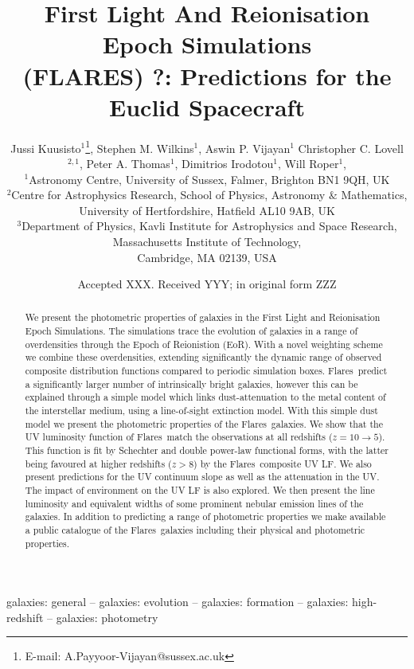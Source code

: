 \documentclass[fleqn,usenatbib]{mnras}
\title[FLARES ?]{First Light And Reionisation Epoch Simulations \\(FLARES) ?: Predictions for the Euclid Spacecraft}
\author[Kuusisto et al.]{Jussi Kuusisto$^{1}$\thanks{E-mail: A.Payyoor-Vijayan@sussex.ac.uk},
Stephen M. Wilkins$^{1}$,
Aswin P. Vijayan$^{1}$
Christopher C. Lovell$^{2,1}$,
\newauthor
Peter A. Thomas$^{1}$,
Dimitrios Irodotou$^{1}$,
Will Roper$^{1}$,
\\
$^{1}$Astronomy Centre, University of Sussex, Falmer, Brighton BN1 9QH, UK\\
$^{2}$Centre for Astrophysics Research, School of Physics, Astronomy $\&$ Mathematics, \\University of Hertfordshire, Hatfield AL10 9AB, UK\\
$^{3}$Department of Physics, Kavli Institute for Astrophysics and Space Research, Massachusetts Institute of Technology,\\Cambridge, MA 02139, USA
}
\date{Accepted XXX. Received YYY; in original form ZZZ}
\newcommand{\flares}{\mbox{\sc Flares}}
\begin{document}
\label{firstpage}
\pagerange{\pageref{firstpage}--\pageref{lastpage}}
\maketitle

\begin{abstract}
We present the photometric properties of galaxies in the First Light and Reionisation Epoch Simulations. The simulations trace the evolution of galaxies in a range of overdensities through the Epoch of Reionistion (EoR). With a novel weighting scheme we combine these overdensities, extending significantly the dynamic range of observed composite distribution functions compared to periodic simulation boxes. \flares\, predict a significantly larger number of intrinsically bright galaxies, however this can be explained through a simple model which links dust-attenuation to the metal content of the interstellar medium, using a line-of-sight extinction model. With this simple dust model we present the photometric properties of the \flares\, galaxies. We show that the UV luminosity function of \flares\, match the observations at all redshifts ($z=10\to5$). This function is fit by Schechter and double power-law functional forms, with the latter being favoured at higher redshifts ($z>8$) by the \flares\, composite UV LF. We also present predictions for the UV continuum slope as well as the attenuation in the UV. The impact of environment on the UV LF is also explored. We then present the line luminosity and equivalent widths of some prominent nebular emission lines of the galaxies. In addition to predicting a range of photometric properties we make available a public catalogue of the \flares\, galaxies including their physical and photometric properties.
\end{abstract}

\begin{keywords}
galaxies: general -- galaxies: evolution -- galaxies: formation -- galaxies: high-redshift -- galaxies: photometry
\end{keywords}









\end{document}
